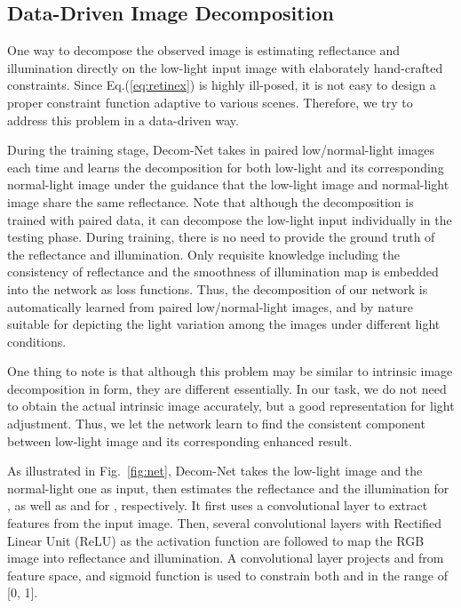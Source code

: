\documentclass{bmvc2k}
\begin{document}
\subsection{Data-Driven Image Decomposition}
One way to decompose the observed image is estimating reflectance and illumination directly on the low-light input image with elaborately hand-crafted constraints. Since Eq.(\ref{eq:retinex}) is highly ill-posed, it is not easy to design a proper constraint function adaptive to various scenes. Therefore, we try to address this problem in a data-driven way.

During the training stage, Decom-Net takes in paired low/normal-light images each time and learns the decomposition for both low-light and its corresponding normal-light image under the guidance that the low-light image and normal-light image share the same reflectance. Note that although the decomposition is trained with paired data, it can decompose the low-light input individually in the testing phase. During training, there is no need to provide the ground truth of the reflectance and illumination. Only requisite knowledge including the consistency of reflectance and the smoothness of illumination map is embedded into the network as loss functions. Thus, the decomposition of our network is automatically learned from paired low/normal-light images, and by nature suitable for depicting the light variation among the images under different light conditions.

One thing to note is that although this problem may be similar to intrinsic image decomposition in form, they are different essentially.
In our task, we do not need to obtain the actual intrinsic image accurately, but a good representation for light adjustment.
Thus, we let the network learn to find the consistent component between low-light image and its corresponding enhanced result.



As illustrated in Fig.~\ref{fig:net}, Decom-Net takes the low-light image  and the normal-light one  as input, then estimates the reflectance  and the illumination  for , as well as  and  for , respectively. It first uses a  convolutional layer to extract features from the input image. Then, several  convolutional layers with Rectified Linear Unit (ReLU) as the activation function are followed to map the RGB image into reflectance and illumination. A  convolutional layer projects  and  from feature space, and sigmoid function is used to constrain both  and  in the range of [0, 1].
\end{document}
